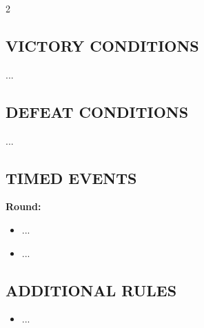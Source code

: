 \begin{multicols*}{2}
\subsection*{\MakeUppercase{Victory Conditions}}
...

\subsection*{\MakeUppercase{Defeat Conditions}}
...

\subsection*{\MakeUppercase{Timed Events}}

\textbf{ Round:}
\begin{itemize}
  \item ...
  \item ...
\end{itemize}

\subsection*{\MakeUppercase{Additional Rules}}

\begin{itemize}
    \item ...
\end{itemize}

\end{multicols*}

